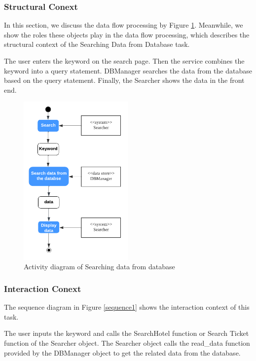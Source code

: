 \documentclass[conference]{IEEEtran}
\begin{document}
\subsubsection{\textbf{Structural Conext }}

\textbf{}

In this section, we discuss the data flow processing by Figure \ref{activity1}. Meanwhile, we show the roles these objects play in the data flow processing, which describes the structural context of the Searching Data from Database task.

The user enters the keyword on the search page. Then the service combines the keyword into a query statement. DBManager searches the data from the database based on the query statement. Finally, the Searcher shows the data in the front end.
\begin{figure}[htbp]
	\centerline{\includegraphics[width=0.5\textwidth]{image/searching hotel activity1.pdf}}
	\caption{Activity diagram of Searching data from database }
	\label{activity1}
\end{figure}


\subsubsection{\textbf{Interaction Conext }}
\textbf{}

The sequence diagram in Figure \ref{sequence1} shows the interaction context of this task. 

The user inputs the keyword and calls the SearchHotel function or Search Ticket function of the Searcher object. The Searcher object calls the read\_data function provided by the DBManager object to get the related data from the database.
\end{document}
